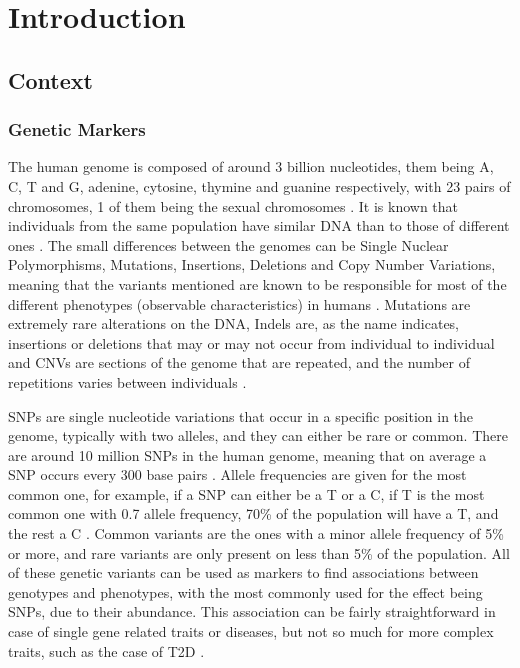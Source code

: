 
\chapter{Introduction} \label{chapter:intro}


\section{Context}

\subsection{Genetic Markers}

The human genome is composed of around 3 billion nucleotides, them being A, C, T and G, adenine, cytosine, thymine and guanine respectively, with 23 pairs of chromosomes, 1 of them being the sexual chromosomes \cite{zhang2012mining}. It is known that individuals from the same population have similar \gls{DNA} than to those of different ones \cite{witherspoon2007genetic}. The small differences between the genomes can be Single Nuclear Polymorphisms, Mutations, Insertions, Deletions and Copy Number Variations, meaning that the variants mentioned are known to be responsible for most of the different phenotypes (observable characteristics) in humans \cite{international2010integrating}. Mutations are extremely rare alterations on the \gls{DNA}, Indels are, as the name indicates, insertions or deletions that may or may not occur from individual to individual and \gls{CNV}s are sections of the genome that are repeated, and the number of repetitions varies between individuals \cite{international2010integrating}.

\gls{SNP}s are single nucleotide variations that occur in a specific position in the genome, typically with two alleles, and they can either be rare or common. There are around 10 million SNPs in the human genome, meaning that on average a \gls{SNP} occurs every 300 base pairs  \cite{international2010integrating}. Allele frequencies are given for the most common one, for example, if a \gls{SNP} can either be a T or a C, if T is the most common one with 0.7 allele frequency, 70\% of the population will have a T, and the rest a C \cite{bush2012genome}. Common variants are the ones with a minor allele frequency of 5\% or more, and rare variants are only present on less than 5\% of the population.
All of these genetic variants can be used as markers to find associations between genotypes and phenotypes, with the most commonly used for the effect being \gls{SNP}s, due to their abundance. This association can be fairly straightforward in case of single gene related traits or diseases, but not so much for more complex traits, such as the case of \gls{T2D} \cite{zhang2012mining}. 

